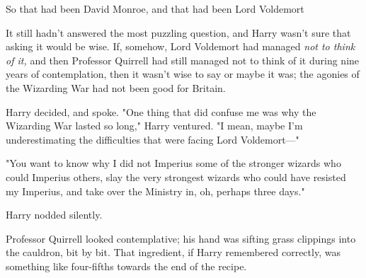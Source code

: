 So that had been David Monroe, and that had been Lord Voldemort{\el}

It still hadn't answered the most puzzling question, and Harry wasn't sure that
asking it would be wise. If, somehow, Lord Voldemort had managed \emph{not to
think of it,} and then Professor Quirrell had still managed not to think of it
during nine years of contemplation, then it wasn't wise to say{\el} or maybe
it was; the agonies of the Wizarding War had not been good for Britain.

Harry decided, and spoke. "One thing that did confuse me was why the Wizarding
War lasted so long," Harry ventured. "I mean, maybe I'm underestimating the
difficulties that were facing Lord Voldemort\mbox{---}"

"You want to know why I did not Imperius some of the stronger wizards who could
Imperius others, slay the very strongest wizards who could have resisted my
Imperius, and take over the Ministry in, oh, perhaps three days."

Harry nodded silently.

Professor Quirrell looked contemplative; his hand was sifting grass clippings
into the cauldron, bit by bit. That ingredient, if Harry remembered correctly,
was something like four-fifths towards the end of the recipe.

